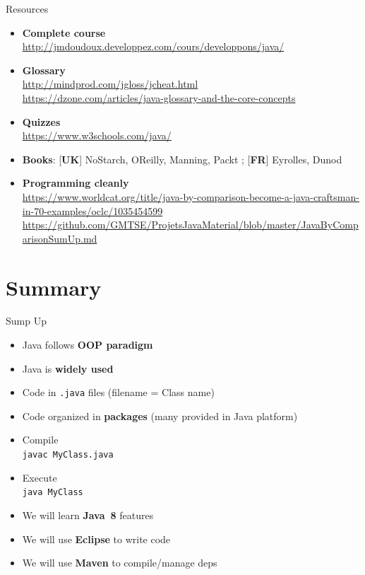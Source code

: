 \documentclass[English,c,%
hyperref={%
    pdftitle={FISA-DE2 OOP in Java},%
    pdfauthor={Muller, Gravier, Laforest, Subercaze},%
    pdfsubject={OOP in Java},%
    pdfkeywords={OOP, Java},%
    colorlinks=true,%
    urlcolor=blue,%
    linkcolor=%
    },%
xcolor={pdftex,svgnames} %
]{beamer}
\begin{document}
\begin{frame}{Resources}
{\begin{itemize}
  \item \textbf{Complete course}\\
  \url{http://jmdoudoux.developpez.com/cours/developpons/java/}

  \item \textbf{Glossary}\\
  \url{http://mindprod.com/jgloss/jcheat.html}\\
  \url{https://dzone.com/articles/java-glossary-and-the-core-concepts}

  \item \textbf{Quizzes}\\
  \url{https://www.w3schools.com/java/}

  \item \textbf{Books}: [\textbf{UK}] NoStarch, OReilly, Manning, Packt ; [\textbf{FR}] Eyrolles, Dunod


  \item \textbf{Programming cleanly}\\
  \url{https://www.worldcat.org/title/java-by-comparison-become-a-java-craftsman-in-70-examples/oclc/1035454599} \\
  \url{https://github.com/GMTSE/ProjetsJavaMaterial/blob/master/JavaByComparisonSumUp.md}

\end{itemize}
}

\end{frame}



\section{Summary}
\begin{frame}{Sump Up}
  \begin{itemize}
    \item Java follows \textbf{OOP paradigm}
    \item Java is \textbf{widely used}
\medskip
    \item Code in \texttt{.java} files (filename = Class name)
    \item Code organized in \textbf{packages} (many provided in Java platform)
    \item Compile\\
    \texttt{javac MyClass.java}
    \item Execute\\
    \texttt{java MyClass}
\medskip
    \item We will learn \textbf{Java~8} features
    \item We will use \textbf{Eclipse} to write code
    \item We will use \textbf{Maven} to compile/manage deps
  \end{itemize}
\end{frame}
\end{document}
